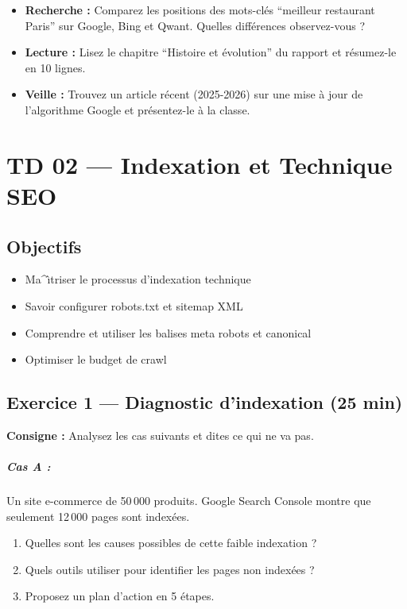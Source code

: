\documentclass[12pt,a4paper]{report}
\begin{document}
\begin{itemize}
    \item \textbf{Recherche :} Comparez les positions des mots-cl\'{e}s ``meilleur restaurant Paris'' sur Google, Bing et Qwant. Quelles diff\'{e}rences observez-vous ?
    \item \textbf{Lecture :} Lisez le chapitre ``Histoire et \'{e}volution'' du rapport et r\'{e}sumez-le en 10 lignes.
    \item \textbf{Veille :} Trouvez un article r\'{e}cent (2025-2026) sur une mise \`{a} jour de l'algorithme Google et pr\'{e}sentez-le \`{a} la classe.
\end{itemize}


\chapter{TD 02 --- Indexation et Technique SEO}

\section{Objectifs}
\begin{itemize}
    \item Ma^{\^\i}triser le processus d'indexation technique
    \item Savoir configurer robots.txt et sitemap XML
    \item Comprendre et utiliser les balises meta robots et canonical
    \item Optimiser le budget de crawl
\end{itemize}

\section{Exercice 1 --- Diagnostic d'indexation (25 min)}

\textbf{Consigne :} Analysez les cas suivants et dites ce qui ne va pas.

\paragraph{Cas A :} Un site e-commerce de 50\,000 produits. Google Search Console montre que seulement 12\,000 pages sont index\'{e}es.

\begin{enumerate}
    \item Quelles sont les causes possibles de cette faible indexation ?
    \item Quels outils utiliser pour identifier les pages non index\'{e}es ?
    \item Proposez un plan d'action en 5 \'{e}tapes.
\end{enumerate}
\end{document}
